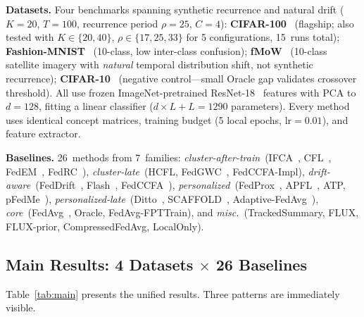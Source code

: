 \documentclass[11pt]{article}
\begin{document}
\textbf{Datasets.}
Four benchmarks spanning synthetic recurrence and natural drift ($K{=}20$, $T{=}100$, recurrence period $\rho{=}25$, $C{=}4$):
\textbf{CIFAR-100}~\citep{krizhevsky2009learning} (flagship; also tested with $K \in \{20,40\}$, $\rho \in \{17,25,33\}$ for 5 configurations, 15~runs total);
\textbf{Fashion-MNIST}~\citep{xiao2017fashion} (10-class, low inter-class confusion);
\textbf{fMoW}~\citep{koh2021wilds} (10-class satellite imagery with \emph{natural} temporal distribution shift, not synthetic recurrence);
\textbf{CIFAR-10}~\citep{krizhevsky2009learning} (negative control---small Oracle gap validates crossover threshold).
All use frozen ImageNet-pretrained ResNet-18~\citep{he2016deep} features with PCA to $d{=}128$, fitting a linear classifier ($d {\times} L {+} L = 1290$ parameters).
Every method uses identical concept matrices, training budget (5 local epochs, $\mathrm{lr}{=}0.01$), and feature extractor.

\textbf{Baselines.}
26~methods from 7~families:
\emph{cluster-after-train}~(IFCA~\citep{ghosh2020efficient}, CFL~\citep{sattler2021clustered}, FedEM~\citep{marfoq2021federated}, FedRC~\citep{guo2024fedrc}),
\emph{cluster-late}~(HCFL, FedGWC~\citep{licciardi2025fedgwc}, FedCCFA-Impl),
\emph{drift-aware}~(FedDrift~\citep{jothimurugesan2023federated}, Flash~\citep{panchal2023flash}, FedCCFA~\citep{chen2024fedccfa}),
\emph{personalized}~(FedProx~\citep{li2020federated}, APFL~\citep{deng2020adaptive}, ATP, pFedMe~\citep{t2020personalized}),
\emph{personalized-late}~(Ditto~\citep{li2021ditto}, SCAFFOLD~\citep{karimireddy2020scaffold}, Adaptive-FedAvg~\citep{reddi2021adaptive}),
\emph{core}~(FedAvg~\citep{mcmahan2017communication}, Oracle, FedAvg-FPTTrain),
and \emph{misc.}~(TrackedSummary, FLUX, FLUX-prior, CompressedFedAvg, LocalOnly).


\subsection{Main Results: 4 Datasets $\times$ 26 Baselines}

Table~\ref{tab:main} presents the unified results.
Three patterns are immediately visible.
\end{document}
